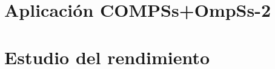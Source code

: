 \section{Aplicación COMPSs+OmpSs-2}



\section{Estudio del rendimiento}































